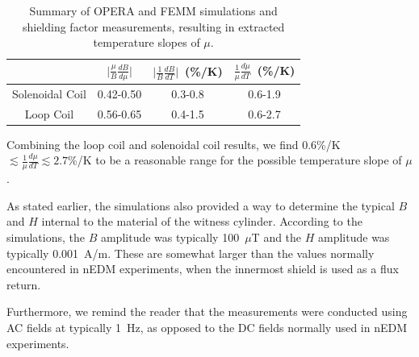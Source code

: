 \begin{center}
\begin{table}
\begin{tabular}{|c|c|c|c|}
\hline 
  & $\vert \frac{\mu}{B}\frac{dB}{d\mu}\vert$ & $\vert \frac{1}{B} \frac{dB}{dT}\vert$~(\%/K) & $\frac{1}{\mu}\frac{d\mu}{dT}$~(\%/K) \\ 
\hline 
Solenoidal Coil & 0.42-0.50 & 0.3-0.8 & 0.6-1.9 \\ 
\hline 
Loop Coil & 0.56-0.65 & 0.4-1.5 & 0.6-2.7 \\ 
\hline 
\end{tabular} 
\caption{Summary of OPERA and FEMM simulations and shielding factor
  measurements, resulting in extracted temperature slopes of $\mu$.}
\label{tab:axialsummary}

\end{table}
\end{center}

Combining the loop coil and solenoidal coil results, we find
0.6\%/K~$\lesssim\frac{1}{\mu}\frac{d\mu}{dT}\lesssim 2.7\%$/K to be a
reasonable range for the possible temperature slope of $\mu$.

As stated earlier, the simulations also provided a way to determine
the typical $B$ and $H$ internal to the material of the witness
cylinder.  According to the simulations, the $B$ amplitude was
typically 100~$\mu$T and the $H$ amplitude was typically 0.001~A/m.  These are
somewhat larger than the values normally encountered in nEDM
experiments, when the innermost shield is used as a flux return.


Furthermore, we remind the reader that the measurements were conducted
using AC fields at typically 1~Hz, as opposed to the DC fields
normally used in nEDM experiments.


